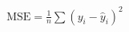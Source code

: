 \documentclass[preview]{standalone}
\begin{document}
\begin{align*}
\text{MSE} = \frac{1}{n}\sum (y_i - \hat{y}_i)^2
\end{align*}
\end{document}
